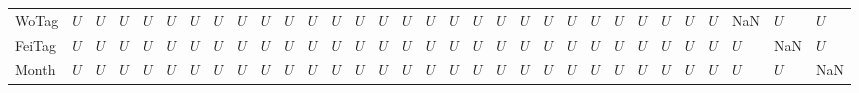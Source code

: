 \begin{tabular}{llllllllllllllllllllllllllllllll}
WoTag  &  $U$ &  $U$ &  $U$ &  $U$ &   $U$ &   $U$ &  $U$ &   $U$ &   $U$ &  $U$ &  $U$ &  $U$ &   $U$ &   $U$ &   $U$ &   $U$ &   $U$ &   $U$ &   $U$ &   $U$ &   $U$ &  $U$ &  $U$ &   $U$ &   $U$ &   $U$ &   $U$ &  $U$ &   NaN &    $U$ &   $U$ \\
FeiTag &  $U$ &  $U$ &  $U$ &  $U$ &   $U$ &   $U$ &  $U$ &   $U$ &   $U$ &  $U$ &  $U$ &  $U$ &   $U$ &   $U$ &   $U$ &   $U$ &   $U$ &   $U$ &   $U$ &   $U$ &   $U$ &  $U$ &  $U$ &   $U$ &   $U$ &   $U$ &   $U$ &  $U$ &   $U$ &    NaN &   $U$ \\
Month  &  $U$ &  $U$ &  $U$ &  $U$ &   $U$ &   $U$ &  $U$ &   $U$ &   $U$ &  $U$ &  $U$ &  $U$ &   $U$ &   $U$ &   $U$ &   $U$ &   $U$ &   $U$ &   $U$ &   $U$ &   $U$ &  $U$ &  $U$ &   $U$ &   $U$ &   $U$ &   $U$ &  $U$ &   $U$ &    $U$ &   NaN \\
\bottomrule
\end{tabular}
